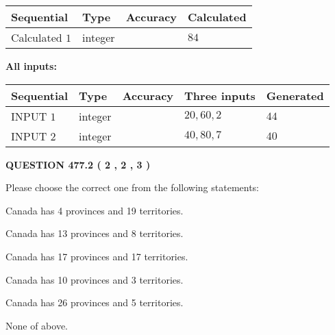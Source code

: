 \documentclass[12pt]{article}
\begin{document}
   
   
   
\noindent{}
   
   
  
  
\noindent\begin{tabular}{|l|l|l|l|}
\hline
 Sequential & Type & Accuracy & Calculated \\ 
\hline
 
 
  Calculated $  1 $ & integer &  & 
  $ 84 $ 
 \\  \hline  
 \end{tabular}
   
   
   
   
\noindent\vspace{0.1in}\hspace{-0.08in} {\textbf{\Large{All inputs: }}}
   
   
  
  
\noindent\begin{tabular}{|l|l|l|l|l|}
\hline
 Sequential & Type & Accuracy & Three inputs & Generated \\ 
\hline
 
 
  INPUT $  1 $ & integer &  & $
 20
 , 
 60
 , 
 2
 $ & $ 44 $ 
 \\  \hline  
 
 
  INPUT $  2 $ & integer &  & $
 40
 , 
 80
 , 
 7
 $ & $ 40 $ 
 \\  \hline  
 \end{tabular}
   
   
  
\vspace{0.2in}
  
{\textbf{\Large{QUESTION
477.2 
 ( 2 , 2 , 3 )
}}}
  
  
Please choose the correct one from the following statements:
 
 
Canada has   4 provinces and  19 territories.
 
 
Canada has  13 provinces and  8 territories.
 
 
Canada has  17 provinces and  17 territories.
 
 
Canada has 10  provinces and 3 territories.
 
 
Canada has  26 provinces and  5 territories.
 
 
 None of above.
 
\end{document}
